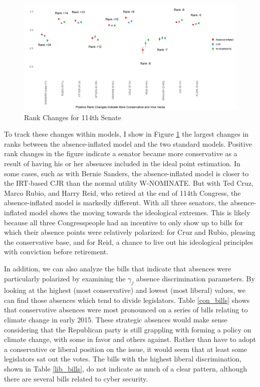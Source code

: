	\begin{figure}
		\centering
		\caption{Rank Changes for 114th Senate}\label{rank_sen}
		\includegraphics[width=0.8\linewidth]{big_diff}
	\end{figure}
	
	To track these changes within models, I show in Figure \ref{rank_sen} the largest changes in ranks between the absence-inflated model and the two standard models. Positive rank changes in the figure indicate a senator became more conservative as a result of having his or her absences included in the ideal point estimation. In some cases, such as with Bernie Sanders, the absence-inflated model is closer to the IRT-based CJR than the normal utility W-NOMINATE. But with Ted Cruz, Marco Rubio, and Harry Reid, who retired at the end of 114th Congress, the absence-inflated model is markedly different. With all three senators, the absence-inflated model shows the moving towards the ideological extremes. This is likely because all three Congresspeople had an incentive to only show up to bills for which their absence points were relatively polarized: for Cruz and Rubio, pleasing the conservative base, and for Reid, a chance to live out his ideological principles with conviction before retirement.
	
	In addition, we can also analyze the bills that indicate that absences were particularly polarized by examining the $\gamma_j$ absence discrimination parameters. By looking at the highest (most conservative) and lowest (most liberal) values, we can find those absences which tend to divide legislators. Table \ref{con_bills} shows that conservative absences were most pronounced on a series of bills relating to climate change in early 2015. These strategic absences would make sense considering that the Republican party is still grappling with forming a policy on climate change, with some in favor and others against. Rather than have to adopt a conservative or liberal position on the issue, it would seem that at least some legislators sat out the votes. The bills with the highest liberal discrimination, shown in Table \ref{lib_bills}, do not indicate as much of a clear pattern, although there are several bills related to cyber security.
	
